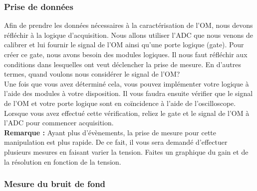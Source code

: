 \subsubsection{Prise de données}

Afin de prendre les données nécessaires à la caractérisation de l'OM, nous devons réfléchir à la logique d'acquisition. Nous allons utiliser l'ADC que nous venons de calibrer et lui fournir le signal de l'OM ainsi qu'une porte logique (gate). Pour créer ce gate, nous avons besoin des modules logiques. Il nous faut réfléchir aux conditions dans lesquelles ont veut déclencher la prise de mesure. En d'autres termes, quand voulons nous considérer le signal de l'OM? \\

Une fois que vous avez déterminé cela, vous pouvez implémenter votre logique à l'aide des modules à votre disposition. Il vous faudra ensuite vérifier que le signal de l'OM et votre porte logique sont en coïncidence à l'aide de l'oscilloscope. Lorsque vous avez effectué cette vérification, reliez le gate et le signal de l'OM à l'ADC pour commencer acquisition.\\

\textbf{Remarque :} Ayant plus d'évènements, la prise de mesure pour cette manipulation est plus rapide. De ce fait, il vous sera demandé d'effectuer plusieurs mesures en faisant varier la tension. Faites un graphique du gain et de la résolution en fonction de la tension.\\


\subsubsection{Mesure du bruit de fond}

